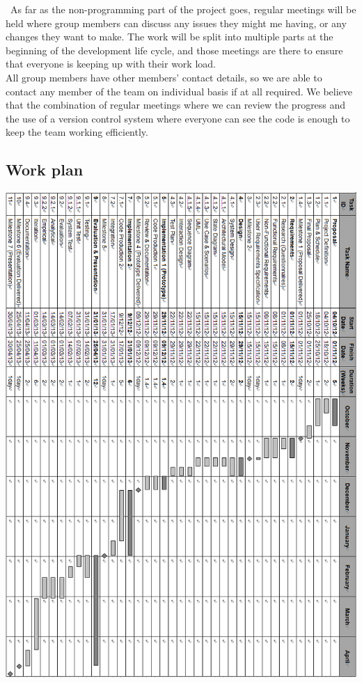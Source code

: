 \documentclass[10pt,a4paper,oneside]{report}
\begin{document}
\
As far as the non-programming part of the project goes, regular meetings will be held where group members can discuss any issues they might me having, or any changes they want to make. The work will be split into multiple parts at the beginning of the development life cycle, and those meetings are there to ensure that everyone is keeping up with their work load.\\

All group members have other members' contact details, so we are able to contact any member of the team on individual basis if at all required. We believe that the combination of regular meetings where we can review the progress and the use of a version control system where everyone can see the code is enough to keep the team working efficiently.

\begin{landscape}
\begin{center}
\hspace*{-1.5in}
\vspace*{-1.5in}
\section*{Work plan}
\includegraphics[height=\textheight,keepaspectratio]{gantt.jpg}
\end{center}
\end{landscape}
\end{document}
